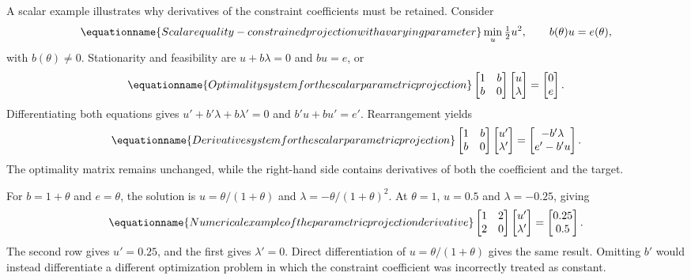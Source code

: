 A scalar example illustrates why derivatives of the constraint coefficients must be retained. Consider
\begin{equation}
\equationname{Scalar equality-constrained projection with a varying parameter}
\min_u\tfrac12u^2,\qquad b(\theta)u=e(\theta),
\end{equation}
with $b(\theta)\ne0$. Stationarity and feasibility are $u+b\lambda=0$ and $bu=e$, or
\begin{equation}
\equationname{Optimality system for the scalar parametric projection}
\begin{bmatrix}1&b\\b&0\end{bmatrix}
\begin{bmatrix}u\\\lambda\end{bmatrix}
=\begin{bmatrix}0\\e\end{bmatrix}.
\end{equation}
Differentiating both equations gives $u'+b'\lambda+b\lambda'=0$ and $b'u+bu'=e'$. Rearrangement yields
\begin{equation}
\equationname{Derivative system for the scalar parametric projection}
\begin{bmatrix}1&b\\b&0\end{bmatrix}
\begin{bmatrix}u'\\\lambda'\end{bmatrix}
=\begin{bmatrix}-b'\lambda\\e'-b'u\end{bmatrix}.
\end{equation}
The optimality matrix remains unchanged, while the right-hand side contains derivatives of both the coefficient and the target.

For $b=1+\theta$ and $e=\theta$, the solution is $u=\theta/(1+\theta)$ and $\lambda=-\theta/(1+\theta)^2$. At $\theta=1$, $u=0.5$ and $\lambda=-0.25$, giving
\begin{equation}
\equationname{Numerical example of the parametric projection derivative}
\begin{bmatrix}1&2\\2&0\end{bmatrix}
\begin{bmatrix}u'\\\lambda'\end{bmatrix}
=\begin{bmatrix}0.25\\0.5\end{bmatrix}.
\end{equation}
The second row gives $u'=0.25$, and the first gives $\lambda'=0$. Direct differentiation of $u=\theta/(1+\theta)$ gives the same result. Omitting $b'$ would instead differentiate a different optimization problem in which the constraint coefficient was incorrectly treated as constant.

